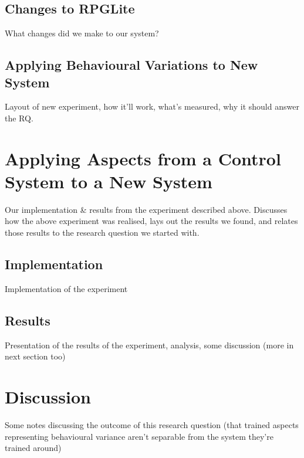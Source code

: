 \subsection{Changes to RPGLite}
What changes did we make to our system?


\subsection{Applying Behavioural Variations to New System}
Layout of new experiment, how it'll work, what's measured, why it should answer
the RQ.


\section{Applying Aspects from a Control System to a New System}
Our implementation \& results from the experiment described above. Discusses how
the above experiment was realised, lays out the results we found, and relates
those results to the research question we started with.

\subsection{Implementation}
Implementation of the experiment

\subsection{Results}
Presentation of the results of the experiment, analysis, some discussion (more
in next section too)

\section{Discussion}
Some notes discussing the outcome of this research question (that trained
aspects representing behavioural variance aren't separable from the system
they're trained around)

